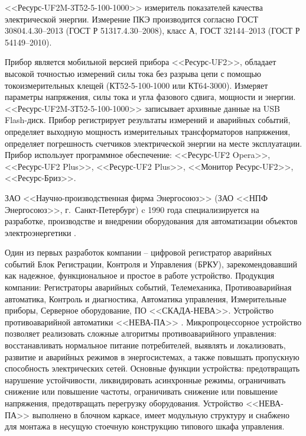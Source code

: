 <<Ресурс-UF2M-3Т52-5-100-1000>> измеритель показателей качества электрической энергии. Измерение ПКЭ производится согласно ГОСТ 30804.4.30--2013 \cite{GOST30804.4.30-2013} (ГОСТ Р 51317.4.30--2008), класс А, ГОСТ 32144--2013 \cite{GOST32144-2013} (ГОСТ Р 54149--2010). 

Прибор является мобильной версией прибора <<Ресурс‑UF2>>, обладает высокой точностью измерений силы тока без разрыва цепи с помощью токоизмерительных клещей (КТ52-5-100-1000 или КТ64-3000). Измеряет параметры напряжения, силы тока и угла фазового сдвига, мощности и энергии. <<Ресурс-UF2M-3Т52-5-100-1000>> записывает архивные данные на USB Flash-диск. Прибор регистрирует результаты измерений и аварийных событий, определяет выходную мощность измерительных трансформаторов напряжения, определяет погрешность счетчиков электрической энергии на месте эксплуатации. Прибор использует программное обеспечение: <<Ресурс-UF2 Opera>>, <<Ресурс-UF2 Plus>>, <<Ресурс-UF2 Plus>>, <<Монитор Ресурс-UF2>>, <<Ресурс-Бриз>>. 

ЗАО <<Научно-производственная фирма Энергосоюз>> (ЗАО <<НПФ Энергосоюз>>, г.~Санкт-Петербург)  c 1990 года специализируется на разработке, производстве и внедрении оборудования для автоматизации объектов электроэнергетики \cite{energy_union}.

Один из первых разработок компании -- цифровой регистратор аварийных событий Блок Регистрации, Контроля и Управления (БРКУ), зарекомендовавший как надежное, функциональное и простое в работе устройство. Продукция компании: Регистраторы аварийных событий, Телемеханика, Противоаварийная автоматика, Контроль и диагностика, Автоматика управления, Измерительные приборы, Серверное оборудование, ПО <<СКАДА-НЕВА>>.
Устройство противоаварийной автоматики <<НЕВА-ПА>> \cite{neva-pa}. 
Микропроцессорное устройство позволяет реализовать сложные алгоритмы противоаварийного управления: восстанавливать нормальное питание потребителей, выявлять и локализовать, развитие и аварийных режимов в энергосистемах, а также повышать пропускную способность электрических сетей. Основные функции устройства: предотвращать нарушение устойчивости, ликвидировать асинхронные режимы, ограничивать снижение или повышение частоты, ограничивать снижение или повышение напряжения, предотвращать перегрузку оборудования. Устройство <<НЕВА-ПА>> выполнено в блочном каркасе, имеет модульную структуру и снабжено для монтажа в несущую стоечную конструкцию типового шкафа управления.

